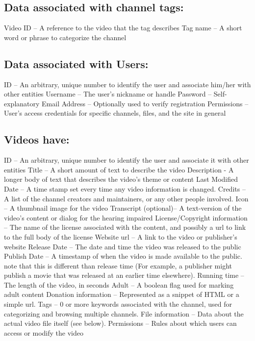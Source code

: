 \documentclass[a4paper,12pt]{report}
\begin{document}
\subsection{Data associated with channel tags:}
Video ID – A reference to the video that the tag describes
Tag name – A short word or phrase to categorize the channel

\subsection{Data associated with Users:}
ID – An arbitrary, unique number to identify the user and associate him/her with other entities
Username – The user's nickname or handle
Password – Self-explanatory
Email Address – Optionally used to verify registration
Permissions – User's access credentials for specific channels, files, and the site in general

\subsection{Videos have:}
ID – An arbitrary, unique number to identify the user and associate it with other entities 
Title – A short amount of text to describe the video
Description - A longer body of text that describes the video's theme or content
Last Modified Date – A time stamp set every time any video information is changed.
Credits – A list of the channel creators and maintainers, or any other people involved. 
Icon – A thumbnail image for the video
Transcript (optional)– A text-version of the video's content or dialog for the hearing impaired
License/Copyright information – The name of the license associated with the content, and possibly a url to link to the full body of the license
Website url – A link to the video  or publisher's website
Release Date – The date and time the video was released to the public
Publish Date – A timestamp of when the video is made available to the public. note that this is different than release time (For example, a publisher might publish a movie that was released at an earlier time elsewhere).
Running time – The length of the video, in seconds
Adult – A boolean flag used for marking adult content
Donation information – Represented as a snippet of HTML or a simple url.
Tags – 0 or more keywords associated with the channel, used for categorizing and 	browsing multiple channels.
File information – Data about the actual video file itself (see below).
Permissions – Rules about which users can access or modify the video
\end{document}
